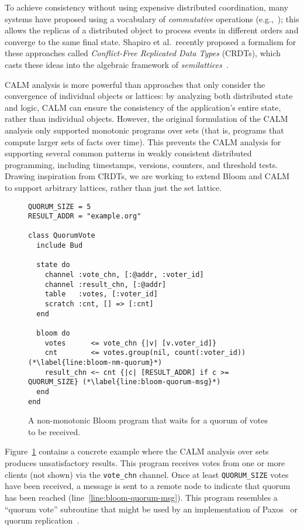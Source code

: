 To achieve consistency without using expensive distributed coordination, many
systems have proposed using a vocabulary of \emph{commutative} operations
(e.g.,~\cite{dynamo,Reiher1994,bayou}); this allows the replicas of a distributed
object to process events in different orders and converge to the same final
state. Shapiro et al.\ recently proposed a formalism for these approaches called
\emph{Conflict-Free Replicated Data Types} (CRDTs), which casts these ideas into
the algebraic framework of \emph{semilattices}~\cite{Shapiro2011a,Shapiro2011b}.

CALM analysis is more powerful than approaches that only consider the
convergence of individual objects or lattices: by analyzing both distributed
state and logic, CALM can ensure the consistency of the application's entire
state, rather than individual objects. However, the original formulation of the
CALM analysis only supported monotonic programs over sets (that is, programs
that compute larger sets of facts over time). This prevents the CALM analysis
for supporting several common patterns in weakly consistent distributed
programming, including timestamps, versions, counters, and threshold
tests. Drawing inspiration from CRDTs, we are working to extend Bloom and CALM
to support arbitrary lattices, rather than just the set lattice.

\begin{figure}[t]
\begin{scriptsize}
\begin{lstlisting}
QUORUM_SIZE = 5
RESULT_ADDR = "example.org"

class QuorumVote
  include Bud

  state do
    channel :vote_chn, [:@addr, :voter_id]
    channel :result_chn, [:@addr]
    table   :votes, [:voter_id]
    scratch :cnt, [] => [:cnt]
  end

  bloom do
    votes      <= vote_chn {|v| [v.voter_id]}
    cnt        <= votes.group(nil, count(:voter_id)) (*\label{line:bloom-nm-quorum}*)
    result_chn <~ cnt {|c| [RESULT_ADDR] if c >= QUORUM_SIZE} (*\label{line:bloom-quorum-msg}*)
  end
end
\end{lstlisting}
\end{scriptsize}
\caption{A non-monotonic Bloom program that waits for a quorum of votes to be received.}
\label{fig:bloom-quorum-set}
\end{figure}

Figure~\ref{fig:bloom-quorum-set} contains a concrete example where the CALM
analysis over sets produces unsatisfactory results. This program receives votes
from one or more clients (not shown) via the \texttt{vote\_chn} channel. Once at
least \texttt{QUORUM\_SIZE} votes have been received, a message is sent to a
remote node to indicate that quorum has been reached
(line~\ref{line:bloom-quorum-msg}). This program resembles a ``quorum vote''
subroutine that might be used by an implementation of Paxos~\cite{part-time} or
quorum replication~\cite{Gifford1979}.

